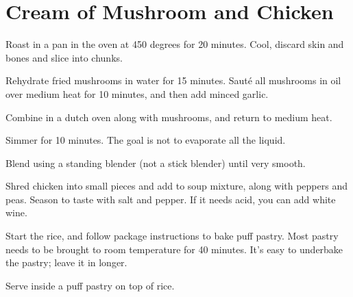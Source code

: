 
\section{Cream of Mushroom and Chicken}
\begin{recipe}



Roast in a pan in the oven at 450 degrees for 20 minutes. Cool, discard skin and bones and slice into chunks.


Rehydrate fried mushrooms in water for 15 minutes.
Sauté all mushrooms in oil over medium heat for 10 minutes, and then add minced garlic.


Combine in a dutch oven along with mushrooms, and return to medium heat.

Simmer for 10 minutes. The goal is not to evaporate all the liquid.

Blend using a standing blender (not a stick blender) until very smooth.


Shred chicken into small pieces and add to soup mixture, along with peppers and peas. Season to taste with salt and pepper. If it needs acid, you can add white wine.


Start the rice, and follow package instructions to bake puff pastry. Most pastry needs to be brought to room temperature for 40 minutes. It's easy to underbake the pastry; leave it in longer.

Serve inside a puff pastry on top of rice.

\end{recipe}
